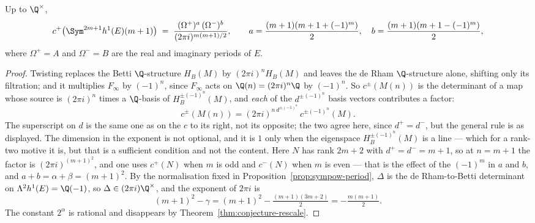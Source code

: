 \begin{corollary}
  \label{cor:sympow-period-crit}
  Up to $\Q^{\times}$,
  \[
    c^{+}\bigl(\Sym^{2m+1}h^{1}(E)(m+1)\bigr)
      \;=\; \frac{(\Omega^{+})^{a}\,(\Omega^{-})^{b}}{(2\pi i)^{m(m+1)/2}},
    \qquad
    a = \frac{(m+1)(m+1+(-1)^{m})}{2},\quad b = \frac{(m+1)(m+1-(-1)^{m})}{2},
  \]
  where $\Omega^{+}=A$ and $\Omega^{-}=B$ are the real and imaginary periods of $E$.
\end{corollary}
\begin{proof}
  Twisting replaces the Betti $\Q$-structure $H_{B}(M)$ by $(2\pi i)^{n}H_{B}(M)$ and leaves
  the de Rham $\Q$-structure alone, shifting only its filtration; and it multiplies
  $F_{\infty}$ by $(-1)^{n}$, since $F_{\infty}$ acts on $\Q(n) = (2\pi i)^{n}\Q$ by
  $(-1)^{n}$. So $c^{\pm}(M(n))$ is the determinant of a map whose source is $(2\pi i)^{n}$
  times a $\Q$-basis of $H_{B}^{\pm(-1)^{n}}(M)$, and \emph{each} of the $d^{\pm(-1)^{n}}$
  basis vectors contributes a factor:
  \[ c^{\pm}(M(n)) = (2\pi i)^{n\,d^{\pm(-1)^{n}}}\,c^{\pm(-1)^{n}}(M). \]
  The superscript on $d$ is the same one as on the $c$ to its right, not its opposite; the two
  agree here, since $d^{+}=d^{-}$, but the general rule is as displayed. The dimension in the
  exponent is not optional, and it is $1$ only when the eigenspace
  $H_{B}^{\pm(-1)^{n}}(M)$ is a line --- which for a rank-two motive it is, but that is a
  sufficient condition and not the content.
  Here $N$ has rank $2m+2$ with $d^{+}=d^{-}=m+1$, so at $n=m+1$ the factor is
  $(2\pi i)^{(m+1)^{2}}$, and one uses $c^{+}(N)$ when $m$ is odd and $c^{-}(N)$ when $m$ is
  even --- that is the effect of the $(-1)^{m}$ in $a$ and $b$, and
  $a+b = \alpha+\beta = (m+1)^{2}$. By the normalisation fixed in
  Proposition~\ref{prop:sympow-period}, $\Delta$ is the de Rham-to-Betti determinant on
  $\Lambda^{2}h^{1}(E) = \Q(-1)$, so $\Delta \in (2\pi i)\Q^{\times}$, and the exponent of
  $2\pi i$ is
  \[ (m+1)^{2} - \gamma = (m+1)^{2} - \tfrac{(m+1)(3m+2)}{2} = -\tfrac{m(m+1)}{2}. \]
  The constant $2^{\alpha}$ is rational and disappears by
  Theorem~\ref{thm:conjecture-rescale}.
\end{proof}

